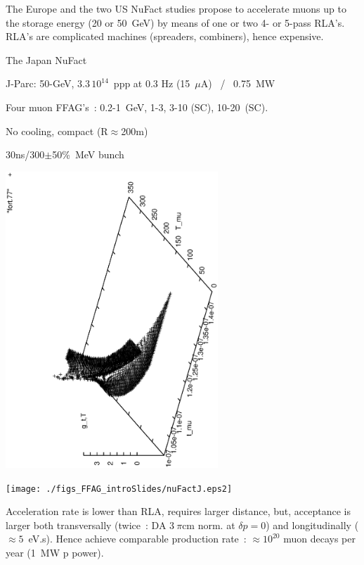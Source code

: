 \documentclass[12pt]{article}
\begin{document}
\begin{minipage}[b]{.55\linewidth}

\large
The Europe and the two US NuFact studies propose  to  accelerate muons up to the storage energy (20 or 50~GeV) 
by means of  one or two 4- or 5-pass RLA's. RLA's are complicated machines (spreaders, combiners), hence expensive. 


\medskip

\LARGE The Japan NuFact

\large

J-Parc: 50-GeV, $3.3\, 10^{14}$~ppp at 0.3 Hz (15~$\mu$A) ~/~ 0.75~MW

Four muon FFAG's~:  0.2-1~GeV, 1-3,  3-10 (SC),  10-20~(SC). 

No cooling,  compact (R$\approx$200m)

\medskip

{\normalsize 30ns/300$\pm$50\%~MeV bunch } %

\vspace{-20mm}

\hspace{-1cm}\includegraphics[angle=-90,width=8cm]{./figs_FFAG_introSlides/g3D-gnuplot.eps}

\vspace{-6cm}
\texttt{[image: ./figs\_FFAG\_introSlides/nuFactJ.eps2]}

\normalsize 
Acceleration rate is lower than RLA, requires larger distance, but, 
acceptance is larger  both transversally (twice~: DA $3~\pi$cm norm. at $\delta p=0$) %
and longitudinally ($\approx5$~eV.s). 
Hence achieve comparable production rate~:   $\approx 10^{20}$ muon decays per year (1~MW p power). 
\end{minipage}\hspace{0mm}
\end{document}
